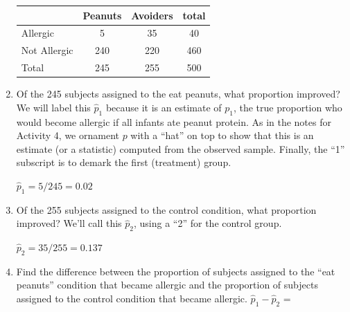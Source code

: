 \begin{enumerate}
\begin{key}
\begin{tabular}[c]{|l|c|c|c|} \hline
        &Peanuts & Avoiders & total \\ \hline
Allergic& 5  & 35  &  40\\ \hline
Not Allergic& 240  &  220 &460 \\ \hline
Total & 245  &  255 & 500\\ \hline
\end{tabular}
\end{key}

\item Of the 245 subjects assigned to the eat peanuts, what proportion
  improved? We will label this 
     $\widehat{p}_1$ because it is an estimate of $p_1$,  the true proportion
     who would become allergic if all infants ate peanut protein.  As
     in the notes for Activity 4,  we ornament $p$ with a ``hat'' on top to
     show that this is an estimate (or 
     a statistic) computed from the observed sample.  Finally, the ``1''
     subscript is to demark the first (treatment) group.
\begin{students}
\vspace{2cm}
\end{students}

\begin{key}
  {\it $\widehat{p}_1 = 5/245 = 0.02$ }
\end{key}



   \item  Of the 255 subjects assigned to the control condition, what
     proportion improved? We'll call this $\widehat{p}_2$, using a ``2''
     for the control group. 
\begin{students}
\vspace{2cm}
\end{students}

\begin{key}
  {\it  $\widehat{p}_2 = 35/255 = 0.137$}
\end{key}



   \item Find the difference between the proportion of subjects
     assigned to the ``eat peanuts'' condition that became allergic and the
     proportion of subjects assigned to the control condition that
     became allergic.  $\widehat{p}_1 - \widehat{p}_2$ = 
\begin{students}
\vspace{2cm}
\end{students}


\end{enumerate}
